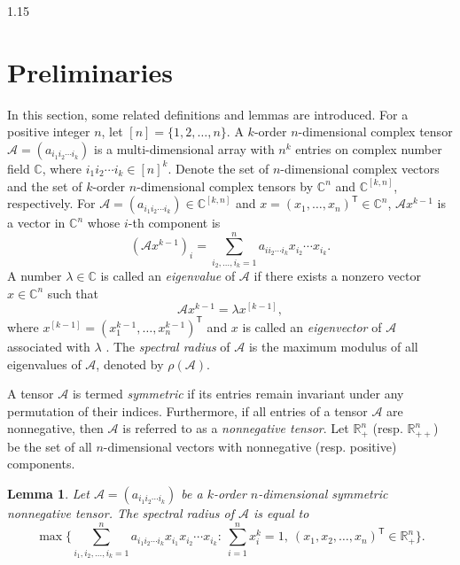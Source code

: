 \documentclass[preprint,12pt]{elsarticle1}
\newtheorem{lem}[thm]{Lemma}
\numberwithin{equation}{section}
\begin{document}
\begin{spacing}{1.15}



\section{Preliminaries}
In this section, some related definitions and lemmas are introduced.
For a positive integer $n$, let $[n]=\{1,2,\ldots,n\}$.
A $k$-order $n$-dimensional complex tensor $\mathcal{A}=(a_{i_1 i_2 \cdots i_k})$ is a multi-dimensional array with $n^k$ entries on complex number field $\mathbb{C}$, where $i_1i_2\cdots i_k\in[n]^k$.
Denote the set of $n$-dimensional complex vectors and the set of $k$-order $n$-dimensional complex tensors by $\mathbb{C}^{n}$ and $\mathbb{C}^{[k,n]}$, respectively.
For $\mathcal{A}=(a_{i_1 i_2 \cdots i_k})\in\mathbb{C}^{[k,n]}$ and $x=(x_1,\ldots,x_n)^{\mathsf{T}}\in\mathbb{C}^{n}$, $\mathcal{A}x^{k-1}$ is a vector in $\mathbb{C}^{n}$ whose $i$-th component is $$\left( \mathcal{A}x^{k-1} \right)_{i}=\sum\limits_{i_2,\ldots,i_k=1}^{n}a_{i i_2 \cdots i_k}x_{i_2}\cdots x_{i_k}.$$
A number $\lambda\in\mathbb{C}$ is called an \textit{eigenvalue} of $\mathcal{A}$ if there exists a nonzero vector $x\in\mathbb{C}^{n}$ such that $$\mathcal{A}x^{k-1}=\lambda x^{[k-1]},$$ where $x^{[k-1]}=(x_1^{k-1},\ldots,x_n^{k-1})^{\mathsf{T}}$ and $x$ is called an \textit{eigenvector} of $\mathcal{A}$ associated with $\lambda$ \cite{lim2005,qi2005}. The \textit{spectral radius} of $\mathcal{A}$ is the maximum modulus of all eigenvalues of $\mathcal{A}$, denoted by $\rho(\mathcal{A})$.

A tensor $\mathcal{A}$ is termed \textit{symmetric} if its entries remain invariant under any permutation of their indices.
Furthermore, if all entries of a tensor $\mathcal{A}$ are nonnegative, then $\mathcal{A}$ is referred to as a \textit{nonnegative tensor}.
Let $\mathbb{R}^{n}_{+}$ (resp. $\mathbb{R}^{n}_{++}$) be the set of all $n$-dimensional vectors with nonnegative (resp. positive) components.

\begin{lem}\cite{qi2013}\label{qi2013}
Let $\mathcal{A}=(a_{i_1 i_2 \cdots i_k})$ be a $k$-order $n$-dimensional symmetric nonnegative tensor. The spectral radius of $\mathcal{A}$ is equal to
$$\max\{\sum_{i_1,i_2,\ldots,i_k=1}^{n}a_{i_1 i_2 \cdots i_k}x_{i_1}x_{i_2}\cdots x_{i_k}:~ \sum_{i=1}^{n}x_i^k=1,~ (x_1,x_2,\ldots,x_n)^{\mathsf{T}}\in\mathbb{R}^{n}_{+}\}.$$
\end{lem}


\end{spacing}
\end{document}
